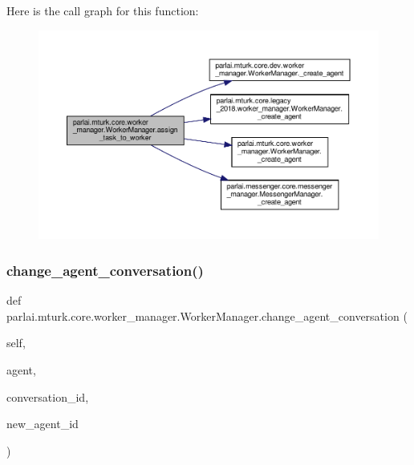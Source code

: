 Here is the call graph for this function\+:
\nopagebreak
\begin{figure}[H]
\begin{center}
\leavevmode
\includegraphics[width=350pt]{classparlai_1_1mturk_1_1core_1_1worker__manager_1_1WorkerManager_a1d5d674e56ea539d50051012780572b5_cgraph}
\end{center}
\end{figure}
\mbox{\label{classparlai_1_1mturk_1_1core_1_1worker__manager_1_1WorkerManager_aa140d322d7237605580f5162a437e0ba}} 
\subsubsection{\texorpdfstring{change\+\_\+agent\+\_\+conversation()}{change\_agent\_conversation()}}
{\footnotesize\ttfamily def parlai.\+mturk.\+core.\+worker\+\_\+manager.\+Worker\+Manager.\+change\+\_\+agent\+\_\+conversation (\begin{DoxyParamCaption}\item[{}]{self,  }\item[{}]{agent,  }\item[{}]{conversation\+\_\+id,  }\item[{}]{new\+\_\+agent\+\_\+id }\end{DoxyParamCaption})}

